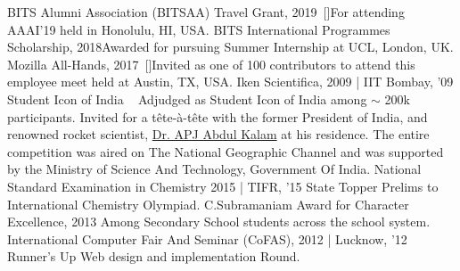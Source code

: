 \begin{talks}
    \award
    {BITS Alumni Association (BITSAA) Travel Grant, 2019}{}{\normalfont ~[\href{https://www.bitsaa.org/page/bitsaa-travel-scholarship}{\small{\websiteSymbol}}]}{For attending AAAI'19 held in Honolulu, HI, USA.}
    \award
    {BITS International Programmes Scholarship, 2018}{}{}{Awarded for pursuing Summer Internship at UCL, London, UK.}
    \award
    {Mozilla All-Hands, 2017}{}{\normalfont ~[\href{https://wiki.mozilla.org/All_Hands/Austin}{\small{\websiteSymbol}}]}{Invited as one of 100 contributors to attend this employee meet held at Austin, TX, USA.}
    \award
	{Iken Scientifica, 2009 | }{IIT Bombay, '09}
	{Student Icon of India ~ {}}
	{Adjudged as Student Icon of India among $\sim$ 200k participants. Invited for a tête-à-tête with the former President of India, and renowned rocket scientist, \href{https://en.wikipedia.org/wiki/A._P._J._Abdul_Kalam}{Dr. APJ Abdul Kalam} at his residence. The entire competition  was aired on The National Geographic Channel and was supported by the Ministry of Science And Technology, Government Of India.}
	\award
	{National Standard Examination in Chemistry 2015 | }{TIFR, '15}
	{State Topper}
	{Prelims to International Chemistry Olympiad.}
	\award
	{C.Subramaniam Award for Character Excellence, 2013}{}
	{}
	{Among Secondary School students across the school system.}
	\award
	{International Computer Fair And Seminar (CoFAS), 2012 | }{Lucknow, '12}
	{Runner's Up}
	{Web design and implementation Round.}
	
\end{talks}    
\vspace{-3mm}

